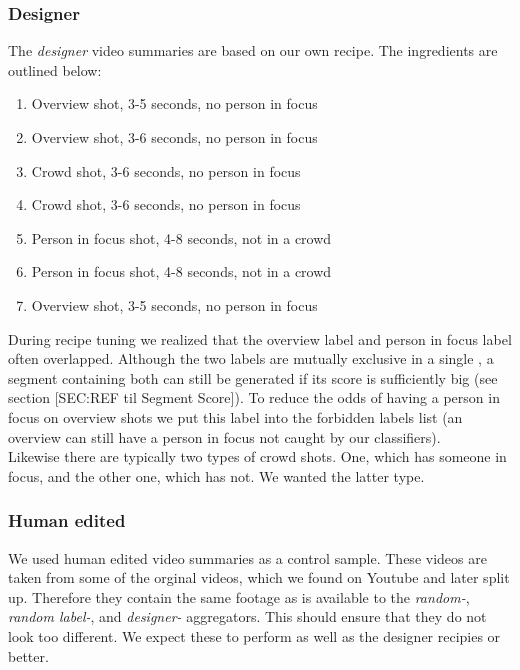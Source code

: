 \subsubsection{Designer}
%
The \textit{designer} video summaries are based on our own recipe. The ingredients are outlined below:
\begin{enumerate}
\item Overview shot, 3-5 seconds, no person in focus
\item Overview shot, 3-6 seconds, no person in focus
\item Crowd shot, 3-6 seconds, no person in focus
\item Crowd shot, 3-6 seconds, no person in focus
\item Person in focus shot, 4-8 seconds, not in a crowd
\item Person in focus shot, 4-8 seconds, not in a crowd
\item Overview shot, 3-5 seconds, no person in focus
\end{enumerate}
%
During recipe tuning we realized that the overview label and person in focus label often overlapped. Although the two labels are mutually exclusive in a single
, a segment containing both can still be generated if its score is sufficiently big (see section [SEC:REF til Segment Score]). To reduce the odds of having a person in focus on overview shots we put this label into the forbidden labels list (an overview can still have a person in focus not caught by our classifiers).\\
Likewise there are typically two types of crowd shots. One, which has someone in focus, and the other one, which has not. We wanted the latter type.
%
\subsubsection{Human edited}
%
We used human edited video summaries as a control sample. These videos are taken from some of the orginal videos, which we found on Youtube and later split up. Therefore they contain the same footage as is available to the \textit{random-}, \textit{random label-}, and \textit{designer-} aggregators. This should ensure that they do not look too different. We expect these to perform as well as the designer recipies or better.
%
